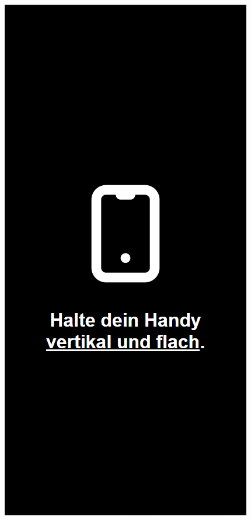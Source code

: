 \documentclass[a4paper,12pt]{scrartcl}
\begin{document}
\begin{figure}[!h]
   \begin{minipage}[t]{.4\linewidth}
      \includegraphics[width=\linewidth]{Abbildungen/Snake_Controller_hint_1.png}

\end{minipage}
\end{figure}
\end{document}
